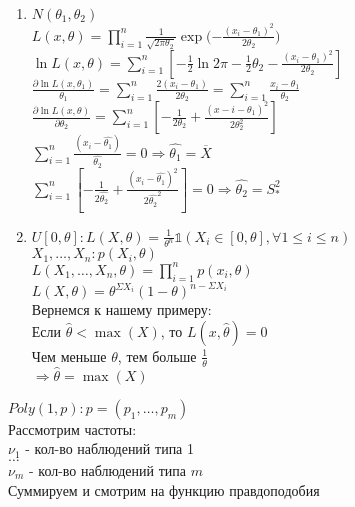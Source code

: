 \documentclass{article}
\newcommand\0{\mathbb{0}}
\newcommand\1{\mathbb{1}}
\begin{document}
\begin{enumerate}
    \item $N(\theta_1, \theta_2)$\\
    $L(x, \theta) = \displaystyle\prod_{i = 1}^n \frac{1}{\sqrt{2\pi \theta_2}} \exp{(-\frac{(x_i - \theta_1)^2}{2\theta_2}})$\\
    $\ln{L(x,\theta)} = \displaystyle\sum_{i = 1}^n [-\frac{1}{2}\ln{2\pi} - \frac{1}{2}\theta_2 - \frac{(x_i - \theta_1)^2}{2\theta_2}]$\\
    $\frac{\partial\ln{L(x, \theta_1)}}{\theta_1} = \displaystyle\sum_{i = 1}^n\frac{2(x_i - \theta_1)}{2\theta_2} = \displaystyle\sum_{i = 1}^n\frac{x_i - \theta_1}{\theta_2}$\\
    $\frac{\partial\ln{L(x, \theta)}}{\partial \theta_2} = \displaystyle\sum_{i = 1}^n[-\frac{1}{2\theta_2} + \frac{(x-i - \theta_1)^2}{2\theta_2^2}]$\\
    $\displaystyle\sum_{i = 1}^n \frac{(x_i - \widehat{\theta_1})}{\widehat{\theta_2}} = 0 \Rightarrow \widehat{\theta_1} = \overline{X}$\\
    $\displaystyle\sum_{i = 1}^n [-\frac{1}{2\widehat{\theta_2}} + \frac{(x_i - \widehat{\theta_1})^2}{2\widehat{\theta_2}^2}] = 0 \Rightarrow \widehat{\theta_2} = S_*^2$
    \item $U[0, \theta]: L(X, \theta) = \frac{1}{\theta^n}\mathbb{1}(X_i \in [0, \theta], \forall 1 \leq i \leq n)$\\
    $X_1, \dots, X_n: p(X_i, \theta)$\\
    $L(X_1, \dots, X_n, \theta) = \displaystyle\prod_{i = 1}^np(x_i, \theta)$\\
    $L(X,\theta) = \theta^{\Sigma X_i}(1 - \theta)^{n - \Sigma X_i}$\\
    Вернемся к нашему примеру:\\
    Если $\widehat{\theta} < \max(X)$, то $L(x, \widehat{\theta}) = 0$\\
    Чем меньше $\theta$, тем больше $\frac{1}{\theta}$\\
    $\Rightarrow \widehat{\theta} = \max(X)$
\end{enumerate}
$Poly(1, p): p = (p_1, \dots, p_m)$\\
Рассмотрим частоты:\\
$\nu_1$ - кол-во наблюдений типа 1\\
$\dots$\\
$\nu_m$ - кол-во наблюдений типа $m$\\
Суммируем и смотрим на функцию правдоподобия\\
\end{document}
